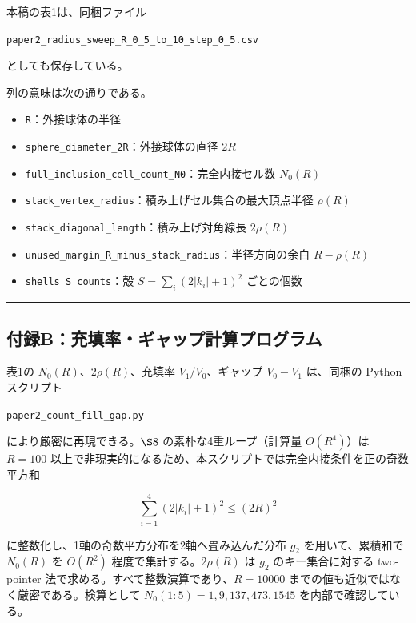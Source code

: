 \documentclass[
]{ltjsarticle}
\providecommand{\tightlist}{%
  \setlength{\itemsep}{0pt}\setlength{\parskip}{0pt}}
\begin{document}
本稿の表1は、同梱ファイル

\texttt{paper2\_radius\_sweep\_R\_0\_5\_to\_10\_step\_0\_5.csv}

としても保存している。

列の意味は次の通りである。

\begin{itemize}
\tightlist
\item
  \texttt{R}：外接球体の半径
\item
  \texttt{sphere\_diameter\_2R}：外接球体の直径 \(2R\)
\item
  \texttt{full\_inclusion\_cell\_count\_N0}：完全内接セル数 \(N_0(R)\)
\item
  \texttt{stack\_vertex\_radius}：積み上げセル集合の最大頂点半径
  \(\rho(R)\)
\item
  \texttt{stack\_diagonal\_length}：積み上げ対角線長 \(2\rho(R)\)
\item
  \texttt{unused\_margin\_R\_minus\_stack\_radius}：半径方向の余白
  \(R-\rho(R)\)
\item
  \texttt{shells\_S\_counts}：殻 \(S=\sum_i(2|k_i|+1)^2\) ごとの個数
\end{itemize}

\begin{center}\rule{0.5\linewidth}{0.5pt}\end{center}

\subsection{付録B：充填率・ギャップ計算プログラム}\label{ux4ed8ux9332bux5145ux586bux7387ux30aeux30e3ux30c3ux30d7ux8a08ux7b97ux30d7ux30edux30b0ux30e9ux30e0}

表1の \(N_0(R)\)、\(2\rho(R)\)、充填率 \(V_1/V_0\)、ギャップ \(V_0-V_1\)
は、同梱の Python スクリプト

\texttt{paper2\_count\_fill\_gap.py}

により厳密に再現できる。\(\S 8\) の素朴な4重ループ（計算量
\(O(R^4)\)）は \(R=100\)
以上で非現実的になるため、本スクリプトでは完全内接条件を正の奇数平方和

\[
\sum_{i=1}^{4}(2|k_i|+1)^2\le(2R)^2
\]

に整数化し、1軸の奇数平方分布を2軸へ畳み込んだ分布 \(g_2\)
を用いて、累積和で \(N_0(R)\) を \(O(R^2)\) 程度で集計する。\(2\rho(R)\)
は \(g_2\) のキー集合に対する two-pointer
法で求める。すべて整数演算であり、\(R=10000\)
までの値も近似ではなく厳密である。検算として
\(N_0(1{:}5)=1,9,137,473,1545\) を内部で確認している。
\end{document}
